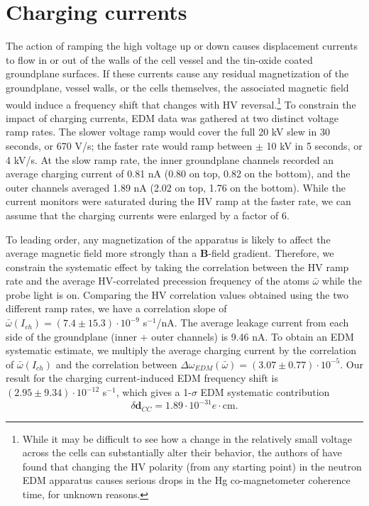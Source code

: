 \documentclass [10pt, twoside] {uwthesis}[2012/04/02]
\begin{document}
\section{Charging currents}
The action of ramping the high voltage up or down causes displacement currents to flow in or out of the walls of the cell vessel and the tin-oxide coated groundplane surfaces. If these currents cause any residual magnetization of the groundplane, vessel walls, or the cells themselves, the associated magnetic field would induce a frequency shift that changes with HV reversal.\footnote{While it may be difficult to see how a change in the relatively small voltage across the cells can substantially alter their behavior, the authors of \cite{2006_ILL_nEDM} have found that changing the HV polarity (from any starting point) in the neutron EDM apparatus causes serious drops in the Hg co-magnetometer coherence time, for unknown reasons.} To constrain the impact of charging currents, EDM data was gathered at two distinct voltage ramp rates. The slower voltage ramp would cover the full 20 kV slew in 30 seconds, or 670 V/s; the faster rate would ramp between $\pm$ 10 kV in 5 seconds, or 4 kV/s. At the slow ramp rate, the inner groundplane channels recorded an average charging current of 0.81 nA (0.80 on top, 0.82 on the bottom), and the outer channels averaged 1.89 nA (2.02 on top, 1.76 on the bottom). While the current monitors were saturated during the HV ramp at the faster rate, we can assume that the charging currents were enlarged by a factor of 6. 

To leading order, any magnetization of the apparatus is likely to affect the average magnetic field more strongly than a $\mathbf{B}$-field gradient. Therefore, we constrain the systematic effect by taking the correlation between the HV ramp rate and the average HV-correlated precession frequency of the atoms $\bar{\omega}$ while the probe light is on. Comparing the HV correlation values obtained using the two different ramp rates, we have a correlation slope of $\bar{\omega}(I_{ch}) = (7.4 \pm 15.3) \cdot 10^{-9}$ s$^{-1}$/nA. The average leakage current from each side of the groundplane (inner + outer channels) is 9.46 nA. To obtain an EDM systematic estimate, we multiply the average charging current by the correlation of $\bar{\omega}(I_{ch})$ and the correlation between $\Delta\omega_{EDM}(\bar{\omega}) = (3.07 \pm 0.77) \cdot 10^{-5}$. Our result for the charging current-induced EDM frequency shift is $(2.95 \pm 9.34) \cdot 10^{-12}$ s$^{-1}$, which gives a 1-$\sigma$ EDM systematic contribution 
\begin{equation}
\delta\mathbf{d}_{CC} = 1.89 \cdot 10^{-31} e\cdot \text{cm}.
\end{equation}
\end{document}
